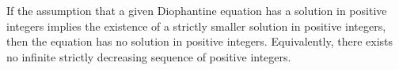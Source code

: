 If the assumption that a given Diophantine equation has a solution in positive integers implies the existence of a strictly smaller solution in positive integers, then the equation has no solution in positive integers. Equivalently, there exists no infinite strictly decreasing sequence of positive integers.
